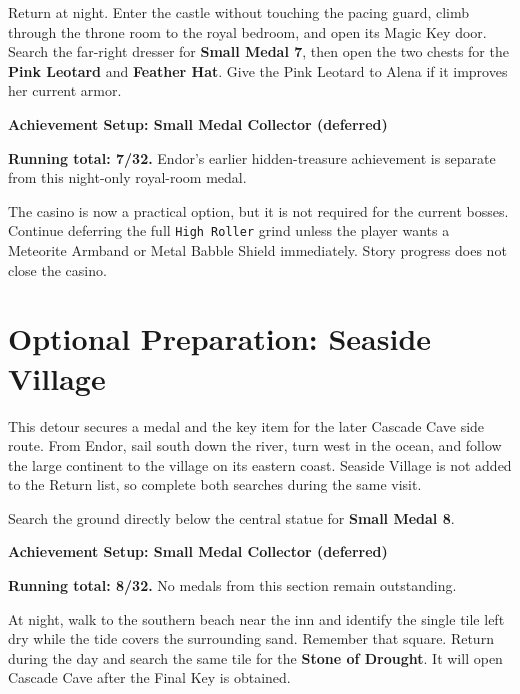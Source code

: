 \documentclass[
  american,
  10pt,
  letterpaper,
  oneside,
  open=any]{scrreprt}
\begin{document}
Return at night. Enter the castle without touching the pacing guard,
climb through the throne room to the royal bedroom, and open its Magic
Key door. Search the far-right dresser for \textbf{Small Medal 7}, then
open the two chests for the \textbf{Pink Leotard} and \textbf{Feather
Hat}. Give the Pink Leotard to Alena if it improves her current armor.

\begin{achievementsetup}

\textbf{Achievement Setup: Small Medal Collector (deferred)}

\textbf{Running total: 7/32.} Endor's earlier hidden-treasure
achievement is separate from this night-only royal-room medal.

\end{achievementsetup}

The casino is now a practical option, but it is not required for the
current bosses. Continue deferring the full \texttt{High\ Roller} grind
unless the player wants a Meteorite Armband or Metal Babble Shield
immediately. Story progress does not close the casino.

\section{Optional Preparation: Seaside
Village}\label{optional-preparation-seaside-village}

This detour secures a medal and the key item for the later Cascade Cave
side route. From Endor, sail south down the river, turn west in the
ocean, and follow the large continent to the village on its eastern
coast. Seaside Village is not added to the Return list, so complete both
searches during the same visit.

Search the ground directly below the central statue for \textbf{Small
Medal 8}.

\begin{achievementsetup}

\textbf{Achievement Setup: Small Medal Collector (deferred)}

\textbf{Running total: 8/32.} No medals from this section remain
outstanding.

\end{achievementsetup}

At night, walk to the southern beach near the inn and identify the
single tile left dry while the tide covers the surrounding sand.
Remember that square. Return during the day and search the same tile for
the \textbf{Stone of Drought}. It will open Cascade Cave after the Final
Key is obtained.
\end{document}
